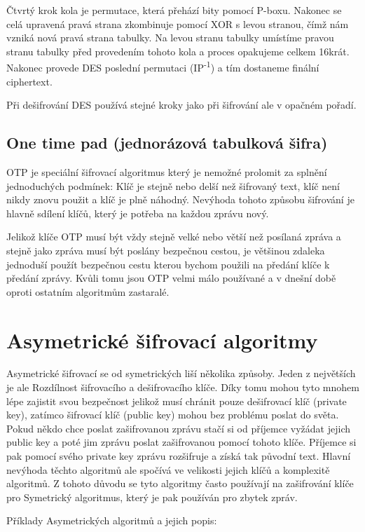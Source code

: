 \documentclass[12pt,a4paper]{report}
\begin{document}
Čtvrtý krok kola je permutace, která přehází bity pomocí P-boxu. Nakonec se celá upravená pravá strana zkombinuje pomocí XOR s levou stranou, čímž nám vzniká nová pravá strana tabulky. Na levou stranu tabulky umístíme pravou stranu tabulky před provedením tohoto kola a proces opakujeme celkem 16krát. Nakonec provede DES poslední permutaci (IP\textsuperscript{-1}) a tím dostaneme finální ciphertext.

Při dešifrování DES používá stejné kroky jako při šifrování ale v opačném pořadí. 

\subsection{One time pad (jednorázová tabulková šifra)}
OTP je speciální šifrovací algoritmus který je nemožné prolomit za splnění jednoduchých podmínek: Klíč je stejně nebo delší než šifrovaný text, klíč není nikdy znovu použit a klíč je plně náhodný. Nevýhoda tohoto způsobu šifrování je hlavně sdílení klíčů, který je potřeba na každou zprávu nový. 

Jelikož klíče OTP musí být vždy stejně velké nebo větší než posílaná zpráva a stejně jako zpráva musí být poslány bezpečnou cestou, je většinou zdaleka jednoduší použít bezpečnou cestu kterou bychom použili na předání klíče k předání zprávy. Kvůli tomu jsou OTP velmi málo používané a v dnešní době oproti ostatním algoritmům zastaralé.



\section{Asymetrické šifrovací algoritmy}
Asymetrické šifrovací se od symetrických liší několika způsoby. Jeden z největších je ale Rozdílnost šifrovacího a dešifrovacího klíče. Díky tomu mohou tyto mnohem lépe zajistit svou bezpečnost jelikož musí chránit pouze dešifrovací klíč (private key), zatímco šifrovací klíč (public key) mohou bez problému poslat do světa. Pokud někdo chce poslat zašifrovanou zprávu stačí si od příjemce vyžádat jejich public key a poté jim zprávu poslat zašifrovanou pomocí tohoto klíče. Příjemce si pak pomocí svého private key zprávu rozšifruje a získá tak původní text. Hlavní nevýhoda těchto algoritmů ale spočívá ve velikosti jejich klíčů a komplexitě algoritmů. Z tohoto důvodu se tyto algoritmy často používají na zašifrování klíče pro Symetrický algoritmus, který je pak používán pro zbytek zpráv. 

Příklady Asymetrických algoritmů a jejich popis:
\end{document}
